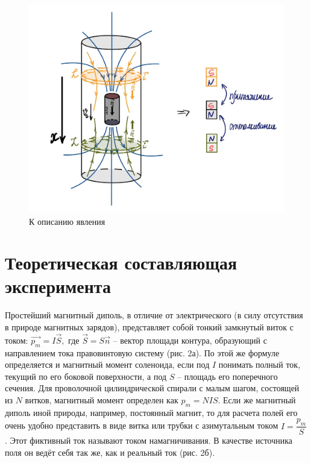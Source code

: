 \documentclass[a4paper,12pt]{article} %
\begin{document}
\begin{figure}[h!]
	\centering
	\includegraphics[scale=0.33]{1.JPG}
	\caption{К описанию явления}
\end{figure}

\newpage


\section{Теоретическая составляющая эксперимента}

Простейший магнитный диполь, в отличие от электрического (в силу отсутствия в природе магнитных зарядов), представляет собой тонкий замкнутый виток с током: $\overrightarrow{p_m} = I\overrightarrow{S},$ где $\overrightarrow{S} = S\overrightarrow{n}$ -- вектор площади контура, образующий с направлением тока правовинтовую систему (рис. 2а). По этой же
формуле определяется и магнитный момент соленоида, если под $I$ понимать полный ток, текущий по его боковой поверхности, а под $S$ -- площадь его поперечного сечения. Для проволочной цилиндрической спирали с малым шагом, состоящей из $N$ витков, магнитный момент определен как $p_m = NIS.$ Если же магнитный диполь иной природы, например, постоянный магнит, то для расчета полей его очень удобно представить в виде витка или трубки с азимутальным током $I = \dfrac{p_m}{S}$. Этот фиктивный ток называют током намагничивания. В качестве источника поля он ведёт себя так же, как и реальный ток (рис. 2б). 
\end{document}
